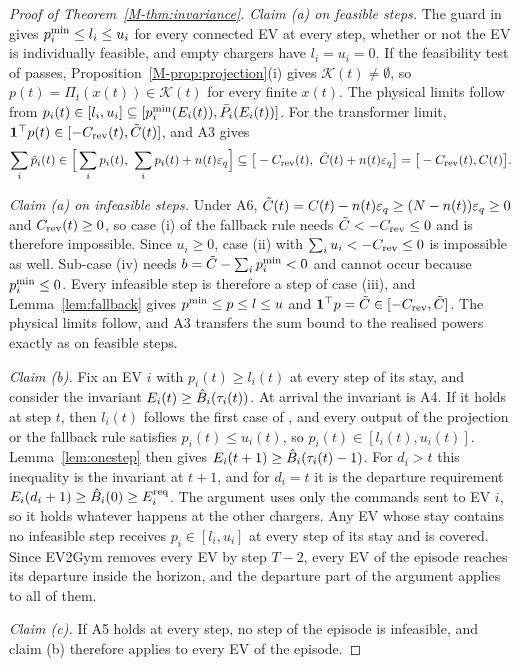 \begin{proof}[Proof of Theorem~\ref{M-thm:invariance}]
\emph{Claim (a) on feasible steps.}
The guard in  gives $p^{\min}_i\le l_i\le u_i$ for every connected EV at every step, whether or not the EV is individually feasible, and empty chargers have $l_i=u_i=0$.
If the feasibility test of  passes, Proposition~\ref{M-prop:projection}(i) gives $\mathcal K(t)\neq\emptyset$, so $p(t)=\Pi_t(x(t))\in\mathcal K(t)$ for every finite $x(t)$.
The physical limits follow from $p_i(t)\in[l_i,u_i]\subseteq[p^{\min}_i(E_i(t)),\bar P_i(E_i(t))]$.
For the transformer limit, $\mathbf 1^\top p(t)\in[-C_{\mathrm{rev}}(t),\tilde C(t)]$, and A3 gives
\[
\sum_i\tilde p_i(t)\in\Big[\sum_ip_i(t),\ \sum_ip_i(t)+n(t)\varepsilon_q\Big]\subseteq\big[-\Crev(t),\ \Ctil(t)+n(t)\varepsilon_q\big]=\big[-\Crev(t),C(t)\big].
\]

\emph{Claim (a) on infeasible steps.}
Under A6, $\tilde C(t)=C(t)-n(t)\varepsilon_q\ge(N-n(t))\varepsilon_q\ge0$ and $C_{\mathrm{rev}}(t)\ge0$, so case (i) of the fallback rule needs $\tilde C<-C_{\mathrm{rev}}\le0$ and is therefore impossible.
Since $u_i\ge0$, case (ii) with $\sum_iu_i<-C_{\mathrm{rev}}\le0$ is impossible as well.
Sub-case (iv) needs $b=\tilde C-\sum_ip^{\min}_i<0$ and cannot occur because $p^{\min}_i\le0$.
Every infeasible step is therefore a step of case (iii), and Lemma~\ref{lem:fallback} gives $p^{\min}\le p\le l\le u$ and $\mathbf 1^\top p=\tilde C\in[-C_{\mathrm{rev}},\tilde C]$.
The physical limits follow, and A3 transfers the sum bound to the realised powers exactly as on feasible steps.

\emph{Claim (b).}
Fix an EV $i$ with $p_i(t)\ge l_i(t)$ at every step of its stay, and consider the invariant $E_i(t)\ge\hat B_i(\tau_i(t))$.
At arrival the invariant is A4.
If it holds at step $t$, then $l_i(t)$ follows the first case of , and every output of the projection or the fallback rule satisfies $p_i(t)\le u_i(t)$, so $p_i(t)\in[l_i(t),u_i(t)]$.
Lemma~\ref{lem:onestep} then gives $E_i(t+1)\ge\hat B_i(\tau_i(t)-1)$.
For $d_i>t$ this inequality is the invariant at $t+1$, and for $d_i=t$ it is the departure requirement $E_i(d_i+1)\ge\hat B_i(0)\ge E^{\mathrm{req}}_i$.
The argument uses only the commands sent to EV $i$, so it holds whatever happens at the other chargers.
Any EV whose stay contains no infeasible step receives $p_i\in[l_i,u_i]$ at every step of its stay and is covered.
Since EV2Gym removes every EV by step $T-2$, every EV of the episode reaches its departure inside the horizon, and the departure part of the argument applies to all of them.

\emph{Claim (c).}
If A5 holds at every step, no step of the episode is infeasible, and claim (b) therefore applies to every EV of the episode.
\end{proof}


